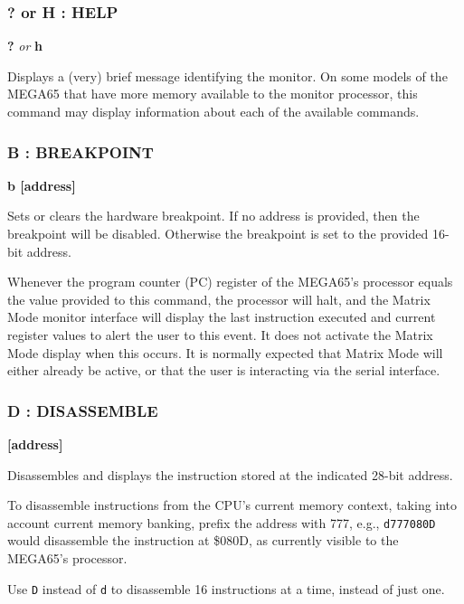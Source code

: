 \subsubsection{? or H : HELP}
\begin{description}[leftmargin=2cm,style=nextline]
\item [Format:] {\bf ?} {\em or} {\bf h}
\item [Usage:] Displays a (very) brief message identifying the monitor.
  On some models of the MEGA65 that have more memory available to the
  monitor processor, this command may display information about each
  of the available commands.

\end{description}


\subsubsection{B : BREAKPOINT}
\begin{description}[leftmargin=2cm,style=nextline]
\item [Format:] {\bf b [address]}
\item [Usage:] Sets or clears the hardware breakpoint. If no address is provided,
  then the breakpoint will be disabled. Otherwise the breakpoint is set to the
  provided 16-bit address.

  Whenever the program counter (PC) register of the MEGA65's processor equals the value
  provided to this command, the processor will halt, and the Matrix Mode monitor interface
  will display the last instruction executed and current register values to alert the user
  to this event. It does not activate the Matrix Mode display when this occurs. It is
  normally expected that Matrix Mode will either already be active, or that the user is
  interacting via the serial interface.

\end{description}


\subsubsection{D : DISASSEMBLE}
\begin{description}[leftmargin=2cm,style=nextline]
\item [Format:] {\bf <d|D> [address]}
\item [Usage:] Disassembles and displays the instruction stored at the
  indicated 28-bit address.

  To disassemble instructions from the CPU's
  current memory context, taking into account current memory banking,
  prefix the address with 777, e.g., {\tt d777080D} would disassemble
  the instruction at \$080D, as currently visible to the MEGA65's
  processor.

  Use {\tt D} instead of {\tt d} to disassemble 16 instructions at a time, instead of just one.

\end{description}

